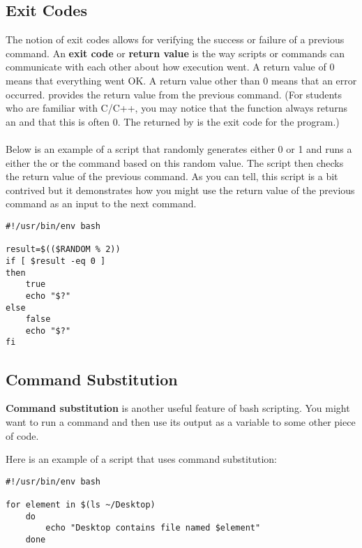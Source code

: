 \documentclass{article}
\begin{document}
\subsection{Exit Codes}
The notion of exit codes allows for verifying the success or failure of a previous command. An \textbf{exit code} or \textbf{return value} is the way scripts or commands can communicate with each other about how execution went. A return value of 0 means that everything went OK. A return value other than 0 means that an error occurred.  provides the return value from the previous command. (For students who are familiar with C/C++, you may notice that the  function always returns an  and that this  is often 0. The  returned by  is the exit code for the program.)
\\
\\
Below is an example of a script that randomly generates either 0 or 1 and runs a either the  or the  command based on this random value. The script then checks the return value of the previous command. As you can tell, this script is a bit contrived but it demonstrates how you might use the return value of the previous command as an input to the next command.
\begin{lstlisting}[style=Python]
#!/usr/bin/env bash

result=$(($RANDOM % 2))
if [ $result -eq 0 ]
then
	true
	echo "$?"
else
	false
	echo "$?"
fi

\end{lstlisting}
\subsection{Command Substitution}
\textbf{Command substitution} is another useful feature of bash scripting. You might want to run a command and then use its output as a variable to some other piece of code. 
\par 
Here is an example of a script that uses command substitution: 
\begin{lstlisting}[style=Python]
#!/usr/bin/env bash

for element in $(ls ~/Desktop)
	do
		echo "Desktop contains file named $element"
	done

\end{lstlisting}
\end{document}
